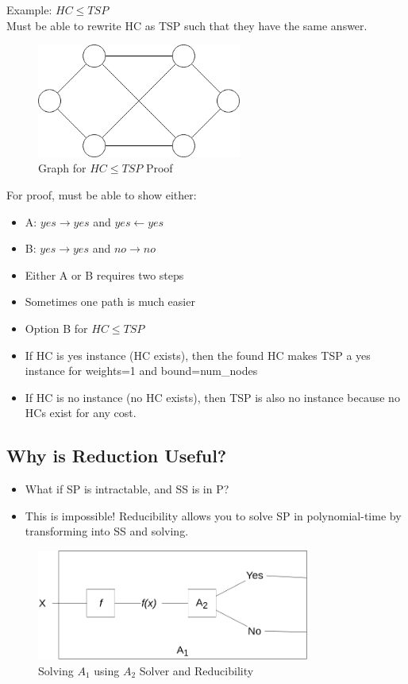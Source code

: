 \documentclass[12pt, letter]{article}
\begin{document}
Example: $HC \le TSP$ \\
Must be able to rewrite HC as TSP such that they have the same answer.
 \begin{figure}[h]
	\centering
	\includegraphics[width=0.6\textwidth]{imgs/hc-tsp}
	\caption{Graph for $HC \le TSP$ Proof}
	\label{fig:imgs-hc-tsp}
\end{figure}

For proof, must be able to show either:
\begin{itemize}
	\item A: $yes \rightarrow yes$ and  $yes \leftarrow yes$
	\item B: $yes \rightarrow yes$ and  $no \rightarrow no$
	\item Either A or B requires two steps
	\item Sometimes one path is much easier
	\item Option B for $HC \le TSP$
	\item If HC is yes instance (HC exists), then the found HC makes TSP a yes instance for weights=1 and bound=num\_nodes
	\item If HC is no instance (no HC exists), then TSP is also no instance because no HCs exist for any cost.
\end{itemize}

\subsection*{Why is Reduction Useful?}
\begin{itemize}
	\item What if SP is intractable, and SS is in P?
	\item This is impossible! Reducibility allows you to solve SP in polynomial-time by transforming into SS and solving.
\end{itemize}

\begin{figure}[h]
	\centering
	\includegraphics[width=0.8\textwidth]{imgs/reduce}
	\caption{Solving $A_1$ using $A_2$ Solver and Reducibility}
	\label{fig:imgs-reduce}
\end{figure}
\end{document}
